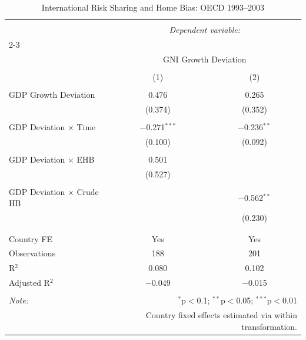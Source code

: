 
\begin{table}[!htbp] \centering 
  \caption{International Risk Sharing and Home Bias: OECD 1993--2003} 
  \label{tab:risk_sharing} 
\begin{tabular}{@{\extracolsep{5pt}}lcc} 
\\[-1.8ex]\hline 
\hline \\[-1.8ex] 
 & \multicolumn{2}{c}{\textit{Dependent variable:}} \\ 
\cline{2-3} 
\\[-1.8ex] & \multicolumn{2}{c}{GNI Growth Deviation} \\ 
\\[-1.8ex] & (1) & (2)\\ 
\hline \\[-1.8ex] 
 GDP Growth Deviation & 0.476 & 0.265 \\ 
  & (0.374) & (0.352) \\ 
  & & \\ 
 GDP Deviation $\times$ Time & $-$0.271$^{***}$ & $-$0.236$^{**}$ \\ 
  & (0.100) & (0.092) \\ 
  & & \\ 
 GDP Deviation $\times$ EHB & 0.501 &  \\ 
  & (0.527) &  \\ 
  & & \\ 
 GDP Deviation $\times$ Crude HB &  & $-$0.562$^{**}$ \\ 
  &  & (0.230) \\ 
  & & \\ 
\hline \\[-1.8ex] 
Country FE & Yes & Yes \\ 
Observations & 188 & 201 \\ 
R$^{2}$ & 0.080 & 0.102 \\ 
Adjusted R$^{2}$ & $-$0.049 & $-$0.015 \\ 
\hline 
\hline \\[-1.8ex] 
\textit{Note:}  & \multicolumn{2}{r}{$^{*}$p$<$0.1; $^{**}$p$<$0.05; $^{***}$p$<$0.01} \\ 
 & \multicolumn{2}{r}{Country fixed effects estimated via within transformation.} \\ 
\end{tabular} 
\end{table} 
